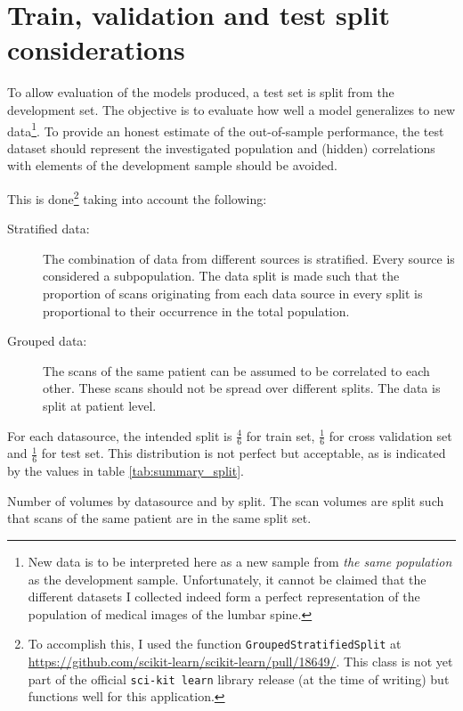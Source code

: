 \section{Train, validation and test split considerations\label{sec:trainValTestSplit}}

To allow evaluation of the models produced, a test set is split from the development set.
The objective is to evaluate how well a model generalizes to new data\footnote{
    New data is to be interpreted here as a new sample from \textit{the same population} as the development sample.
    Unfortunately, it cannot be claimed that the different datasets I collected indeed form a perfect representation of the population of medical images of the lumbar spine.}. 
To provide an honest estimate of the out-of-sample performance, the test dataset should represent the investigated population and (hidden) correlations with elements of the development sample should be avoided.

This is done\footnote{
    To accomplish this, I used the function \texttt{GroupedStratifiedSplit} at \url{https://github.com/scikit-learn/scikit-learn/pull/18649/}. 
    This class is not yet part of the official \texttt{sci-kit learn} library release (at the time of writing) but functions well for this application.} taking into account the following:
\begin{description}
    \item[Stratified data:] The combination of data from different sources is stratified. Every source is considered a subpopulation. The data split is made such that the proportion of scans originating from each data source in every split is proportional to their occurrence in the total population.
    \item[Grouped data:] The scans of the same patient can be assumed to be correlated to each other. These scans should not be spread over different splits. The data is split at patient level.
\end{description}

For each datasource, the intended split is $\frac{4}{6}$ for train set, $\frac{1}{6}$ for cross validation set and $\frac{1}{6}$ for test set.
This distribution is not perfect but acceptable, as is indicated by the values in table \ref{tab:summary_split}.

\begin{SCtable}[\sidecaptionrelwidth][h]
 
    
    \caption{Number of volumes by datasource and by split. The scan volumes are split such that scans of the same patient are in the same split set.\label{tab:summary_split}}
  
  \end{SCtable}


